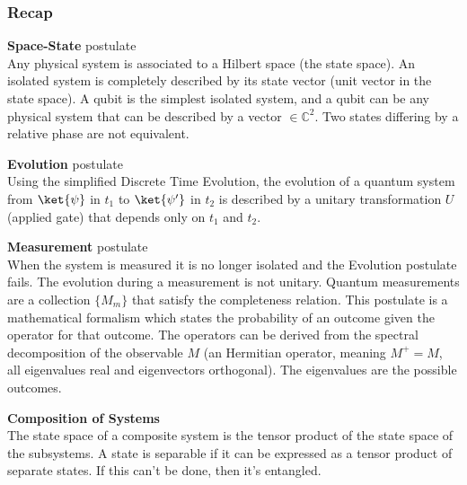 \documentclass[10pt]{report}
\begin{document}
\subsubsection{Recap}
\begin{list}{}{}
	\item \textbf{Space-State} postulate\\
	Any physical system is associated to a Hilbert space (the state space). An isolated system is completely described by its state vector (unit vector in the state space). A qubit is the simplest isolated system, and a qubit can be any physical system that can be described by a vector $\in \mathbb{C}^2$. Two states differing by a relative phase are not equivalent.
	\item \textbf{Evolution} postulate\\
	Using the simplified Discrete Time Evolution, the evolution of a quantum system from $\ket{\psi}$ in $t_1$ to $\ket{\psi'}$ in $t_2$ is described by a unitary transformation $U$ (applied gate) that depends only on $t_1$ and $t_2$.
	\item \textbf{Measurement} postulate\\
	When the system is measured it is no longer isolated and the Evolution postulate fails. The evolution during a measurement is not unitary. Quantum measurements are a collection $\{M_m\}$ that satisfy the completeness relation. This postulate is a mathematical formalism which states the probability of an outcome given the operator for that outcome. The operators can be derived from the spectral decomposition of the observable $M$ (an Hermitian operator, meaning $M^+=M$, all eigenvalues real and eigenvectors orthogonal). The eigenvalues are the possible outcomes.
	\item \textbf{Composition of Systems}\\
	The state space of a composite system is the tensor product of the state space of the subsystems. A state is separable if it can be expressed as a tensor product of separate states. If this can't be done, then it's entangled.
\end{list}
\end{document}

